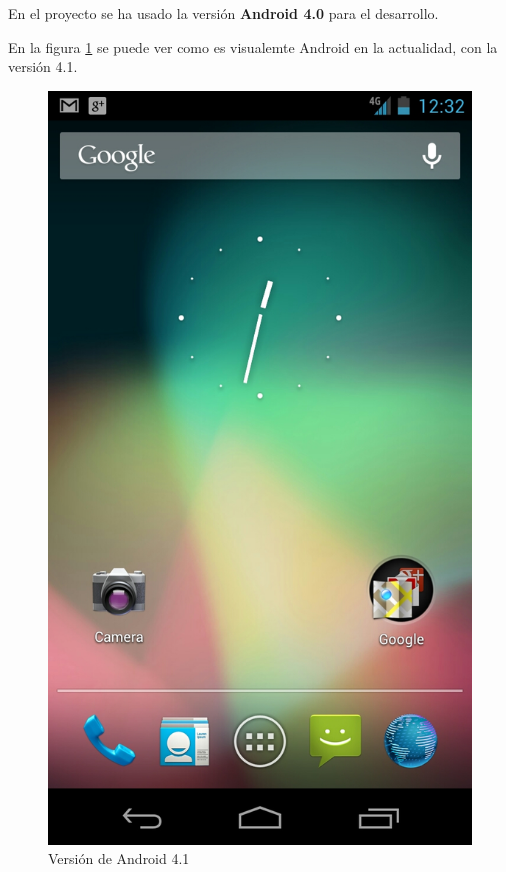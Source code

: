 En el proyecto se ha usado la versión \textbf{Android 4.0} para el desarrollo.

En la figura \ref{fig:Android41} se puede ver como es visualemte Android en la actualidad, con la versión 4.1.

\begin{figure}
  \centering
    \includegraphics[scale=0.2]{./ConocimientosPrevios/imagenes/android41.jpeg}
  \caption{Versión de Android 4.1}
  \label{fig:Android41}
\end{figure}


